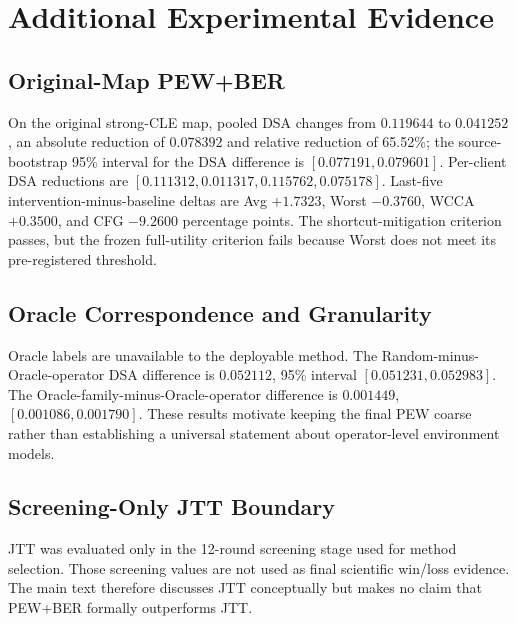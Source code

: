 \documentclass[10pt,twocolumn]{article}
\begin{document}
\section{Additional Experimental Evidence}

\subsection{Original-Map PEW+BER}

On the original strong-CLE map, pooled DSA changes from \(0.119644\) to \(0.041252\), an absolute reduction of \(0.078392\) and relative reduction of 65.52\%; the source-bootstrap 95\% interval for the DSA difference is \([0.077191,0.079601]\). Per-client DSA reductions are \([0.111312,0.011317,0.115762,0.075178]\). Last-five intervention-minus-baseline deltas are Avg \(+1.7323\), Worst \(-0.3760\), WCCA \(+0.3500\), and CFG \(-9.2600\) percentage points. The shortcut-mitigation criterion passes, but the frozen full-utility criterion fails because Worst does not meet its pre-registered threshold.

\subsection{Oracle Correspondence and Granularity}

\begin{table}[t]
\centering
\small
\caption{Experimental summary 4.}
\label{tab:auto4}
\end{table}

Oracle labels are unavailable to the deployable method. The Random-minus-Oracle-operator DSA difference is \(0.052112\), 95\% interval \([0.051231,0.052983]\). The Oracle-family-minus-Oracle-operator difference is \(0.001449\), \([0.001086,0.001790]\). These results motivate keeping the final PEW coarse rather than establishing a universal statement about operator-level environment models.

\subsection{Screening-Only JTT Boundary}

JTT was evaluated only in the 12-round screening stage used for method selection. Those screening values are not used as final scientific win/loss evidence. The main text therefore discusses JTT conceptually \citep{liu2021jtt} but makes no claim that PEW+BER formally outperforms JTT.



\end{document}
